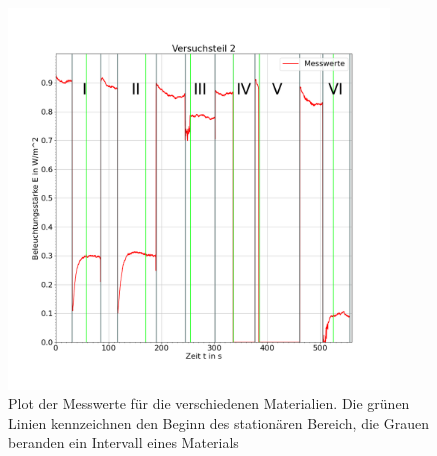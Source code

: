 \documentclass{article}
\begin{document}
            \begin{figure}[H]
                \includegraphics[width=0.9\textwidth]{Daten/Matplot.png}
                \caption{Plot der Messwerte für die verschiedenen Materialien. Die grünen Linien kennzeichnen
                den Beginn des stationären Bereich, die Grauen beranden ein Intervall eines Materials}
            \end{figure}
\end{document}
